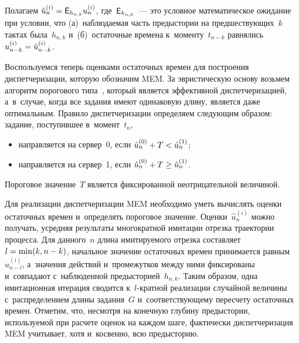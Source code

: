 \begin{multicols}{2}
    Полагаем $\hat{u}_n^{(i)} \hm= {\sf E}_{h_{n,k}}u_n^{(i)}$,  
где~${\sf E}_{h_{n,k}}$~--- это условное математическое ожидание при условии, что 
(а)~наблюдаемая часть предыстории на предшествующих~$k$ тактах была~$h_{n,k}$ 
и~(б)~остаточные времена к~моменту~$t_{n-k}$ равнялись $u^{(i)}_{n-k}\hm= 
\hat{u}^{(i)}_{n-k}$.
    
    Воспользуемся теперь оценками остаточных времен для построения диспетчеризации, 
которую обозначим MEM. За эвристическую основу возьмем алгоритм порогового 
типа~\cite{22-kon}, который является эффективной диспетчеризацией, а~в~случае, когда 
все задания имеют одинаковую длину, является даже оптимальным. Правило 
диспетчеризации определяем следующим образом: задание, поступившее в~момент~$t_n$,
\begin{itemize}
    \item
    направляется на сервер~0, если $\hat{u}_n^{(0)}\hm+T \hm < \hat{u}_n^{(1)}$;
    \item
    направляется на сервер~1, если $\hat{u}_n^{(0)}\hm+T \hm \geq \hat{u}_n^{(1)}$.
    \end{itemize}
    
    Пороговое значение~$T$ является фиксированной неотрицательной величиной.
    
    Для реализации диспетчеризации MEM необходимо уметь вычислять оценки 
остаточных времен и~определять пороговое значение. Оценки~$\hat{u}_n^{(i)}$ можно 
получать, усредняя результаты многократной имитации отрезка траектории процесса. Для 
данного~$n$   длина имитируемого отрезка составляет $l\hm= \min (k, n-k)$, начальное 
значение остаточных времен принимается равным~$\hat{u}^{(i)}_{n-l}$, а~значения 
действий и~промежутков между ними фиксированы и~совпадают с~наблюденной 
предысторией~$h_{n,k}$. Таким образом, одна имитационная итерация сводится  
к~$l$-крат\-ной реализации случайной величины с~распределением длины задания~$G$ 
и~соответствующему пересчету остаточных времен. Отметим, что, несмотря на конечную 
глубину предыстории, используемой при расчете оценок на каждом шаге, фактически 
диспетчеризация MEM учитывает, хотя и~косвенно, всю предысторию.

\begin{table*}\small %
\begin{center}
\vspace*{2ex}


\end{center}
\end{table*}
\end{multicols}
